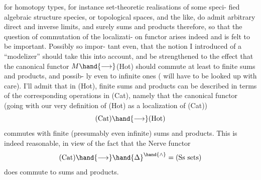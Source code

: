 for homotopy types,  for  instance set-theoretic realisations of some speci-%
fied algebraic structure species, or topological spaces,  and the like,
do admit arbitrary direct and inverse limits,  and surely  sums and
products therefore,  so that the question of commutation of the localizati-%
on functor  arises indeed and is felt to be important.  Possibly so impor-%
tant even,  that the notion I introduced of a ``modelizer'' should take this
into account,  and be strengthened to the effect that the canonical functor
$M\hand{\longrightarrow}$(Hot)  should commute at least to finite sums and products,  and possib-%
ly even to infinite ones (   will have to be looked up with care).  I'll
admit  that in (Hot),  finite sums and products can be described in terms of
the corresponding operations in (Cat),  namely that the canonical functor
(going with our very definition of (Hot) as a localization of (Cat))
\[ (\mathrm{Cat}) \hand{\longrightarrow} (\mathrm{Hot}) \]
commutes with finite (presumably even infinite) sums and products. This is
indeed reasonable,  in view of the fact that the Nerve functor
\[ (\mathrm{Cat}) \hand{\longrightarrow} \hand{\Delta}^{\hand{\wedge}} = (\mathrm{Ss\ sets}) \]
does commute to sums and products.

